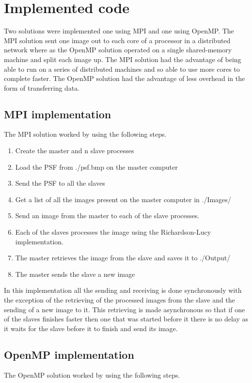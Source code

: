 \section*{Implemented code}

Two solutions were implemented one using MPI and one using OpenMP. The MPI solution sent one image out to each core of a processor in a distributed network where as the OpenMP solution operated on a single shared-memory machine and split each image up. The MPI solution had the advantage of being able to run on a series of distributed machines and so able to use more cores to complete faster. The OpenMP solution had the advantage of less overhead in the form of transferring data.

\subsection*{MPI implementation}
The MPI solution worked by using the following steps.

\begin{enumerate}
	\item Create the master and n slave processes
	\item Load the PSF from ./psf.bmp on the master computer
	\item Send the PSF to all the slaves
	\item Get a list of all the images present on the master computer in ./Images/
	\item Send an image from the master to each of the slave processes.
	\item Each of the slaves processes the image using the Richardson-Lucy implementation.
	\item The master retrieves the image from the slave and saves it to ./Output/
	\item The master sends the slave a new image
\end{enumerate}

In this implementation all the sending and receiving is done synchronously with the exception of the retrieving of the processed images from the slave and the sending of a new image to it. This retrieving is made asynchronous so that if one of the slaves finishes faster then one that was started before it there is no delay as it waits for the slave before it to finish and send its image.

\subsection*{OpenMP implementation}
The OpenMP solution worked by using the following steps.

